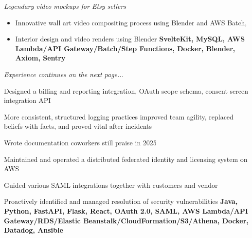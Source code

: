 \documentclass[a4paper,10pt]{article}
\begin{document}
\begin{resume_list}
\begin{itemize}[itemsep=-2px, parsep=1pt, leftmargin=10pt]
              \end{itemize}
              \vspace{5pt}
               \textit{Legendary video mockups for Etsy sellers}
              \begin{itemize}[itemsep=-2px, parsep=1pt, leftmargin=10pt]
                \item Innovative wall art video compositing process using Blender and AWS Batch,
                \item Interior design and video renders using Blender
                \newline \textbf{SvelteKit, MySQL, AWS Lambda/API Gateway/Batch/Step Functions, Docker, Blender, Axiom, Sentry}
              \end{itemize}
            \end{resume_list}

            \vspace{30pt}
            \hspace{10pt}\textit{Experience continues on the next page...}

            \begin{resume_list}
              \item Designed a billing and reporting integration, OAuth scope schema, consent screen integration API
              \item More consistent, structured logging practices improved team agility, replaced beliefs with facts, and proved vital after incidents
              \item Wrote documentation coworkers still praise in 2025
              \item Maintained and operated a distributed federated identity and licensing system on AWS
              \item Guided various SAML integrations together with customers and vendor
              \item Proactively identified and managed resolution of security vulnerabilities
              \newline \textbf{Java, Python, FastAPI, Flask, React, OAuth 2.0, SAML, AWS Lambda/API Gateway/RDS/Elastic Beanstalk/CloudFormation/S3/Athena, Docker, Datadog, Ansible}
            \end{resume_list}
\end{document}
